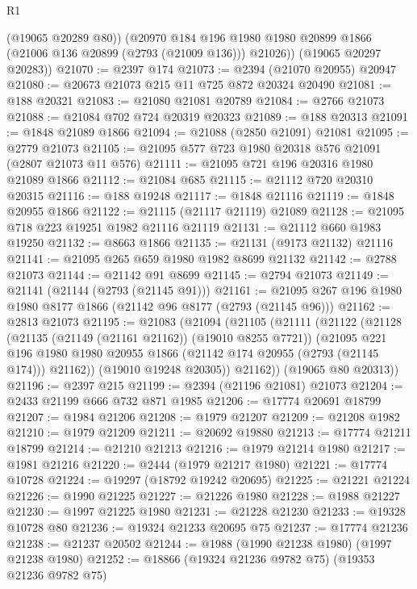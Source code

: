 \begin{lexlean}{R1}
\begin{coremodule}
          (@19065 @20289 @80))
        (@20970
          @184
          @196
          @1980
          @1980
          @20899
          @1866
          (@21006 @136 @20899 (@2793 (@21009 @136)))
          @21026))
      (@19065 @20297 @20283))
@21070 := @2397 @174
@21073 := @2394 (@21070 @20955) @20947
@21080 := @20673 @21073 @215 @11 @725 @872 @20324 @20490
@21081 := @188 @20321
@21083 := @21080 @21081 @20789
@21084 := @2766 @21073
@21088 := @21084 @702 @724 @20319 @20323
@21089 := @188 @20313
@21091 := @1848 @21089 @1866
@21094 := @21088 (@2850 @21091) @21081
@21095 := @2779 @21073
@21105 := @21095 @577 @723 @1980 @20318 @576 @21091 (@2807 @21073 @11 @576)
@21111 := @21095 @721 @196 @20316 @1980 @21089 @1866
@21112 := @21084 @685
@21115 := @21112 @720 @20310 @20315
@21116 := @188 @19248
@21117 := @1848 @21116
@21119 := @1848 @20955 @1866
@21122 := @21115 (@21117 @21119) @21089
@21128 := @21095 @718 @223 @19251 @1982 @21116 @21119
@21131 := @21112 @660 @1983 @19250
@21132 := @8663 @1866
@21135 := @21131 (@9173 @21132) @21116
@21141 := @21095 @265 @659 @1980 @1982 @8699 @21132
@21142 := @2788 @21073
@21144 := @21142 @91 @8699
@21145 := @2794 @21073
@21149 := @21141 (@21144 (@2793 (@21145 @91)))
@21161 := @21095 @267 @196 @1980 @1980 @8177 @1866 (@21142 @96 @8177 (@2793 (@21145 @96)))
@21162 := @2813 @21073
@21195 := @21083
    (@21094
      (@21105
        (@21111
          (@21122
            (@21128
              (@21135 (@21149 (@21161 @21162)) (@19010 @8255 @7721))
              (@21095
                @221
                @196
                @1980
                @1980
                @20955
                @1866
                (@21142 @174 @20955 (@2793 (@21145 @174)))
                @21162))
            (@19010 @19248 @20305))
          @21162))
      (@19065 @80 @20313))
@21196 := @2397 @215
@21199 := @2394 (@21196 @21081) @21073
@21204 := @2433 @21199 @666 @732 @871 @1985
@21206 := @17774 @20691 @18799
@21207 := @1984 @21206
@21208 := @1979 @21207
@21209 := @21208 @1982
@21210 := @1979 @21209
@21211 := @20692 @19880
@21213 := @17774 @21211 @18799
@21214 := @21210 @21213
@21216 := @1979 @21214 @1980
@21217 := @1981 @21216
@21220 := @2444 (@1979 @21217 @1980)
@21221 := @17774 @10728
@21224 := @19297 (@18792 @19242 @20695)
@21225 := @21221 @21224
@21226 := @1990 @21225
@21227 := @21226 @1980
@21228 := @1988 @21227
@21230 := @1997 @21225 @1980
@21231 := @21228 @21230
@21233 := @19328 @10728 @80
@21236 := @19324 @21233 @20695 @75
@21237 := @17774 @21236
@21238 := @21237 @20502
@21244 := @1988 (@1990 @21238 @1980) (@1997 @21238 @1980)
@21252 := @18866 (@19324 @21236 @9782 @75) (@19353 @21236 @9782 @75)

\end{coremodule}
\end{lexlean}
